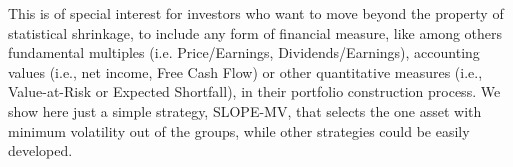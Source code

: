 \documentclass[12pt, a4paper]{article}
\begin{document}
This is of special interest for investors who want to move beyond the property of statistical shrinkage, to include any form of financial measure, like among others fundamental multiples (i.e. Price/Earnings, Dividends/Earnings), accounting values (i.e., net income, Free Cash Flow) or other quantitative measures (i.e., Value-at-Risk or Expected Shortfall), in their portfolio construction process. We show here just a simple strategy, SLOPE-MV, that selects the one asset with minimum volatility out of the groups, while other strategies could be easily developed. 
\end{document}

